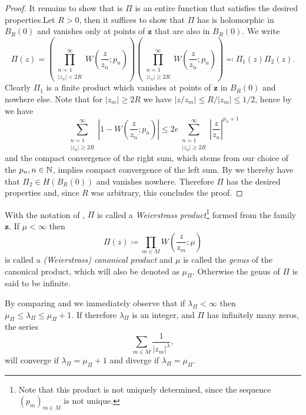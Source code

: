 \begin{proof}
    It remains to show that is $\Pi$ is an entire function that satisfies the desired properties.Let $R > 0$, then it suffices to show that $\Pi$ has is holomorphic in $B_R(0)$ and vanishes only at points of $\mathbf{z}$ that are also in $B_R(0)$. We write
    $$ \Pi(z) = \left( \prod_{\substack{n=1 \\ \vert z_n \vert < 2R }}^\infty W\left(\frac{z}{z_n}; p_n\right) \right) \left( \prod_{\substack{n=1 \\ \vert z_n \vert \geq 2R }}^\infty W\left(\frac{z}{z_n}; p_n\right) \right) \eqqcolon \Pi_1(z) \Pi_2(z). $$
    Clearly $\Pi_1$ is a finite product which vanishes at points of $\mathbf{z}$ in $B_R(0)$ and nowhere else. Note that for $\vert z_m \vert \geq 2R$ we have $\vert z / z_m \vert \leq R / \vert z_m \vert \leq 1 / 2$, hence by  we have
    $$ \sum_{\substack{n=1 \\ \vert z_n \vert \geq 2R }}^\infty \left\vert 1 - W\left(\frac{z}{z_n}; p_n\right) \right\vert \leq 2e \sum_{\substack{n=1 \\ \vert z_n \vert \geq 2R }}^\infty \left\vert \frac{z}{z_n} \right\vert^{p_n + 1} $$
    and the compact convergence of the right sum, which stems from our choice of the $p_n, n \in \mathbb{N}$, implies compact convergence of the left sum. By  we thereby have that $\Pi_2 \in H(B_R(0))$ and vanishes nowhere. Therefore $\Pi$ has the desired properties and, since $R$ was arbitrary, this concludes the proof.
\end{proof}

\begin{definition} \label{def:canonical-product}
    With the notation of , $\Pi$ is called a \emph{Weierstrass product}\footnote{Note that this product is not uniquely determined, since the sequence $(p_m)_{m \in M}$ is not unique.} formed from the family $\mathbf{z}$. If $\mu < \infty$ then
    \begin{equation}
        \Pi(z) \coloneqq \prod_{m \in M} W\left(\frac{z}{z_m}; \mu \right)
    \end{equation}
    is called a \emph{(Weierstrass) canonical product} and $\mu$ is called the \emph{genus} of the canonical product, which will also be denoted as $\mu_\Pi$. Otherwise the genus of $\Pi$ is said to be infinite.
\end{definition}

\begin{remark}
    By comparing  and  we immediately observe that if $\lambda_\Pi < \infty$ then $\mu_\Pi \leq \lambda_\Pi \leq \mu_\Pi + 1$. If therefore $\lambda_\Pi$ is an integer, and $\Pi$ has infinitely many zeros, the series
    $$ \sum_{m \in M} \frac{1}{\vert z_m \vert^{\lambda}}, $$
    will converge if $\lambda_\Pi = \mu_\Pi + 1$ and diverge if $\lambda_\Pi = \mu_\Pi$.
\end{remark}

